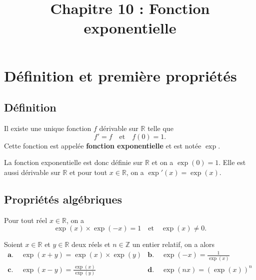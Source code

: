 \documentclass[11pt]{article}
\title{Chapitre 10 : Fonction exponentielle}
\date{}
\author{}
\begin{document}
\maketitle\thispagestyle{fancy}

\section{Définition et première propriétés}
\subsection{Définition}
\begin{thmadm}
  Il existe une unique fonction $f$ dérivable sur $\mathbb{R}$ telle que
  \[
    f' = f\quad\text{et}\quad f(0)=1.
  \]
  Cette fonction est appelée \textbf{fonction exponentielle} et est notée
  $\exp$.
\end{thmadm}
\begin{rmq}
  La fonction exponentielle est donc définie sur $\mathbb{R}$ et on a
  $\exp(0)=1$. Elle est aussi dérivable sur $\mathbb{R}$ et pour tout
  $x\in\mathbb{R}$, on a $\exp'(x)=\exp(x)$.
\end{rmq}

\subsection{Propriétés algébriques}
\begin{prop}
  Pour tout réel $x\in\mathbb{R}$, on a
  \[
    \exp(x)\times\exp(-x)=1\quad\text{et}\quad\exp(x)\neq0.
  \]
\end{prop}
\begin{prop}
  Soient $x\in\mathbb{R}$ et $y\in\mathbb{R}$ deux réels et $n\in\mathbb{Z}$ un
  entier relatif, on a alors
  \begin{align*}
    \textbf{a.}\;& \exp(x+y) = \exp(x)\times\exp(y) &
    \textbf{b.}\;& \exp(-x) = \frac{1}{\exp(x)} \\
    \textbf{c.}\;& \exp(x-y) = \frac{\exp(x)}{\exp(y)} &
    \textbf{d.}\;& \exp(nx) = (\exp(x))^n
  \end{align*}
\end{prop}
\end{document}
